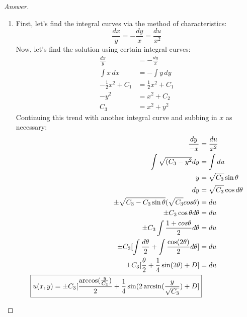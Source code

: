 \documentclass{article}
\theoremstyle{definition}
\renewcommand\qedsymbol{$\blacksquare$}
\newenvironment{ans}{\begin{proof}[Answer]\renewcommand{\qedsymbol}{}}{\end{proof}}
\begin{document}
\begin{ans}
\begin{enumerate}[resume*=answers]
			\item First, let's find the integral curves via the method of characteristics:
                $$\frac{dx}{y} = -\frac{dy}{x} = \frac{du}{x^2}$$
            Now, let's find the solution using certain integral curves:
            \begin{align*}
                \frac{dx}{y} &= -\frac{dy}{x}\\
                \int x\,dx &= -\int y\,dy\\
                -\frac{1}{2}x^2 + C_1&= \frac{1}{2}x^2 + C_1\\
                -y^2 &= x^2 + C_2\\
                C_3 &= x^2 + y^2
            \end{align*}
            Continuing this trend with another integral curve and subbing in $x$ as necessary:
            \begin{align*}\frac{dy}{-x} &= \frac{du}{x^2}\\
                \int \sqrt{(C_3-y^2} dy &= \int du\\
		y &= \sqrt{C_3 }\sin\theta \\
		dy &= \sqrt{C_3} \cos d\theta \\
		\pm \sqrt{C_3 - C_3 \sin \theta}(\sqrt{C_3}cos\theta) &= du\\
		\pm C_3\cos\theta d\theta &= du\\
		\pm C_3 \int \frac{1 +cos\theta}{2} d\theta &= du\\
		\pm C_3 [\int \frac{d\theta}{2} + \int \frac{\cos(2\theta)}{2} d\theta] &= du\\
		\pm C_3 [\frac{\theta}{2} + \frac{1}{4}\sin(2\theta) + D] &= du\\
		\Aboxed{u(x, y) = \pm C_3[\frac{\arccos(\frac{y}{C_3})}{2} + \frac{1}{4}\sin(2 \arcsin (\frac{y}{\sqrt{C_3}}) + D]} \end{align*}
				

\end{enumerate}
\end{ans}
\end{document}
